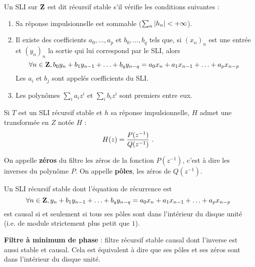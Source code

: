 \begin{defn}
	Un SLI sur $\mathbf{Z}$ est dit récursif stable s'il vérifie les conditions suivantes :
	\begin{enumerate}
	\item
		Sa réponse impulsionnelle est sommable ($\sum_n \left\lvert h_n\right\rvert < + \infty$).
	\item
		Il existe des coefficients $a_0,\ldots,a_p$ et $b_0,\ldots,b_q$ tels que, si $(x_n)_n$ est une entrée et $(y_n)_n$ la sortie qui lui correspond par le SLI, alors
		\vspace{-0.15cm}$$
		\forall n \in \Z, b_0 y_n + b_1 y_{n - 1} + \ldots + b_q y_{n - q} = a_0 x_n + a_1 x_{n - 1} + \ldots + a_p x_{n - p}
		\vspace{-0.15cm}$$
		Les $a_i$ et $b_j$ sont appelés coefficients du SLI.
	\item
		Les polynômes $\sum_i a_i z^i$ et $\sum_i b_i z^i$ sont premiers entre eux.
	\end{enumerate}
\end{defn}

\begin{pop}
	Si $T$ est un SLI récursif stable et $h$ sa réponse impulsionnelle, $H$ admet une transformée en $Z$ notée $H$ :
	\vspace{-0.15cm}$$
	H(z) = \frac{P(z^{-1})}{Q(z^{-1})}\ .
	\vspace{-0.15cm}$$
\end{pop}

\begin{defn}
	On appelle \textbf{zéros} du filtre les zéros de la fonction $P(z^{-1})$, c'est à dire les inverses du polynôme $P$.
	On appelle \textbf{pôles}, les zéros de $Q(z^{-1})$.
\end{defn}

\begin{pop}
	Un SLI récursif stable dont l'équation de récurrence est
	\vspace{-0.15cm}$$
	\forall n \in \Z, y_n + b_1 y_{n - 1} + \ldots + b_q y_{n - q} = a_0 x_n + a_1 x_{n - 1} + \ldots + a_p x_{n - p}
	\vspace{-0.15cm}$$
	est causal si et seulement si tous ses pôles sont dans l'intérieur du disque unité (i.e. de module strictement plus petit que $1$).
\end{pop}

\begin{defn}
	\textbf{Filtre à minimum de phase} : filtre récursif stable causal dont l'inverse est aussi stable et causal.
	Cela est équivalent à dire que ses pôles et ses zéros sont dans l'intérieur du disque unité.
\end{defn}
